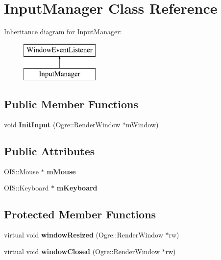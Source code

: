 \hypertarget{class_input_manager}{}\section{Input\+Manager Class Reference}
\label{class_input_manager}
Inheritance diagram for Input\+Manager\+:\begin{figure}[H]
\begin{center}
\leavevmode
\includegraphics[height=2.000000cm]{class_input_manager}
\end{center}
\end{figure}
\subsection*{Public Member Functions}
\begin{DoxyCompactItemize}
\item 
\hypertarget{class_input_manager_a4279d1e21e43fbb588d2b02b752cf64a}{}void {\bfseries Init\+Input} (Ogre\+::\+Render\+Window $\ast$m\+Window)\label{class_input_manager_a4279d1e21e43fbb588d2b02b752cf64a}

\end{DoxyCompactItemize}
\subsection*{Public Attributes}
\begin{DoxyCompactItemize}
\item 
\hypertarget{class_input_manager_a8c44ba031e327eb7d6b58d0164381f84}{}O\+I\+S\+::\+Mouse $\ast$ {\bfseries m\+Mouse}\label{class_input_manager_a8c44ba031e327eb7d6b58d0164381f84}

\item 
\hypertarget{class_input_manager_af4b794dea8a8e3cd3edf9a1272827cf3}{}O\+I\+S\+::\+Keyboard $\ast$ {\bfseries m\+Keyboard}\label{class_input_manager_af4b794dea8a8e3cd3edf9a1272827cf3}

\end{DoxyCompactItemize}
\subsection*{Protected Member Functions}
\begin{DoxyCompactItemize}
\item 
\hypertarget{class_input_manager_a6197219d09c7d3c6d51ffbc2cb493bf1}{}virtual void {\bfseries window\+Resized} (Ogre\+::\+Render\+Window $\ast$rw)\label{class_input_manager_a6197219d09c7d3c6d51ffbc2cb493bf1}

\item 
\hypertarget{class_input_manager_aeb337d8cc54ff987cca0c73ff212d6bf}{}virtual void {\bfseries window\+Closed} (Ogre\+::\+Render\+Window $\ast$rw)\label{class_input_manager_aeb337d8cc54ff987cca0c73ff212d6bf}

\end{DoxyCompactItemize}

